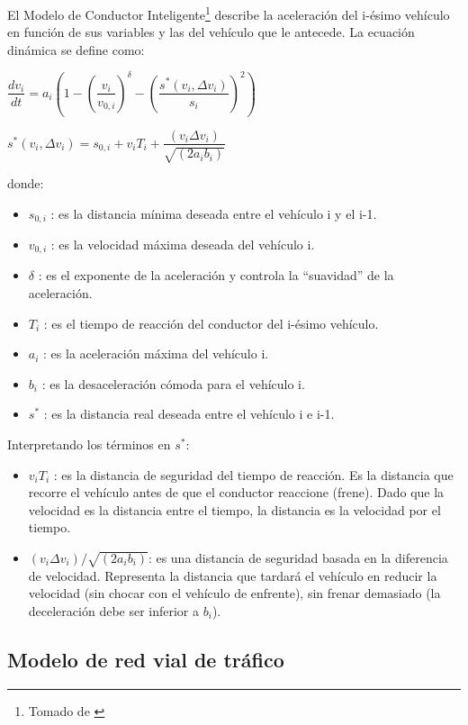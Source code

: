 \documentclass[colorinlistoftodos,twoside,twocolumn]{article} %
\begin{document}
	El Modelo de Conductor Inteligente\footnote{Tomado de \cite{A1}} describe la aceleración del i-ésimo vehículo en función de sus variables y las del vehículo que le antecede. La ecuación dinámica se define como:
	
	\begin{center}
		$  \dfrac{dv_{i}}{dt} = a_{i} \left(1 - \left(\dfrac{v_{i}}{v_{0,i}}\right)^{\delta} - \left(\dfrac{s^{*}(v_{i}, \Delta v_{i})}{s_{i}}\right)^{2}\right)$
		
		\vspace{0.5em}
		$ s^{*}(v_{i}, \Delta v_{i}) =  s_{0,i} + v_{i}T_{i} + \dfrac{(v_{i} \Delta v_{i})}{\sqrt{(2a_{i} b_{i})}}$
	\end{center}
	donde:
	\begin{itemize}
		\item $ s_{0,i} $ : es la distancia mínima deseada entre el vehículo i y el i-1.
		\item $ v_{0,i} $ : es la velocidad máxima deseada del vehículo i.
		\item $\delta$ : es el exponente de la aceleración y controla la “suavidad” de la aceleración.
		\item $ T_{i} $  : es el tiempo de reacción del conductor del i-ésimo vehículo.
		\item $ a_{i} $ : es la aceleración máxima del vehículo i.
		\item $ b_{i} $ : es la desaceleración cómoda para el vehículo i.
		\item $ s^{*} $ : es la distancia real deseada entre el vehículo i e i-1.
	\end{itemize}
	
	Interpretando los t\'erminos en $ s^{*} $:
	\begin{itemize}
		\item $ v_{i}T_{i}  $ : es la distancia de seguridad del tiempo de reacción. Es la distancia que recorre el vehículo antes de que el conductor reaccione (frene).
		Dado que la velocidad es la distancia entre el tiempo, la distancia es la velocidad por el tiempo.
		\item $ (v_{i} \Delta v_{i})/\sqrt{(2a_{i} b_{i})} $: es una distancia de seguridad basada en la diferencia de velocidad. Representa la distancia que tardará el vehículo en reducir la velocidad (sin chocar con el vehículo de enfrente), sin frenar demasiado (la deceleración debe ser inferior a $ b_{i} $).
	\end{itemize}
	
	\subsection{Modelo de red vial de tráfico}
	
\end{document}
